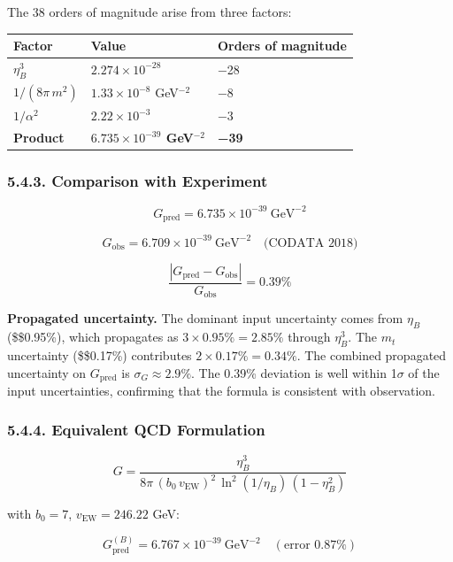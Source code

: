 \documentclass[
  11pt,
]{article}
\begin{document}
The 38 orders of magnitude arise from three factors:

\begin{longtable}[]{@{}lll@{}}
\toprule
Factor & Value & Orders of magnitude\tabularnewline
\midrule
\endhead
\(\eta_B^3\) & \(2.274 \times 10^{-28}\) & −28\tabularnewline
\(1/(8\pi\,m^2)\) & \(1.33 \times 10^{-8}\) GeV\(^{-2}\) &
−8\tabularnewline
\(1/\alpha^2\) & \(2.22 \times 10^{-3}\) & −3\tabularnewline
\textbf{Product} & \textbf{\(6.735 \times 10^{-39}\) GeV\(^{-2}\)} &
\textbf{−39}\tabularnewline
\bottomrule
\end{longtable}

\hypertarget{comparison-with-experiment}{%
\subsubsection{5.4.3. Comparison with
Experiment}\label{comparison-with-experiment}}

\[G_{\text{pred}} = 6.735 \times 10^{-39}~\text{GeV}^{-2} \tag{236}\]

\[G_{\text{obs}} = 6.709 \times 10^{-39}~\text{GeV}^{-2} \quad \text{(CODATA 2018)} \tag{237}\]

\[\frac{|G_{\text{pred}} - G_{\text{obs}}|}{G_{\text{obs}}} = 0.39\% \tag{238}\]

\textbf{Propagated uncertainty.} The dominant input uncertainty comes
from \(\eta_B\) (\$\pm\$0.95\%), which propagates as
\(3 \times 0.95\% = 2.85\%\) through \(\eta_B^3\). The \(m_t\)
uncertainty (\$\pm\$0.17\%) contributes \(2 \times 0.17\% = 0.34\%\).
The combined propagated uncertainty on \(G_{\text{pred}}\) is
\(\sigma_G \approx 2.9\%\). The 0.39\% deviation is well within
1\(\sigma\) of the input uncertainties, confirming that the formula is
consistent with observation.

\hypertarget{equivalent-qcd-formulation}{%
\subsubsection{5.4.4. Equivalent QCD
Formulation}\label{equivalent-qcd-formulation}}

\[G = \frac{\eta_B^3}{8\pi\,(b_0\,v_{\text{EW}})^2\,\ln^2(1/\eta_B)\,(1 - \eta_B^2)} \tag{239}\]

with \(b_0 = 7\), \(v_{\text{EW}} = 246.22\) GeV:

\[G_{\text{pred}}^{(B)} = 6.767 \times 10^{-39}~\text{GeV}^{-2} \quad (\text{error } 0.87\%) \tag{240}\]

\bigskip
\end{document}
